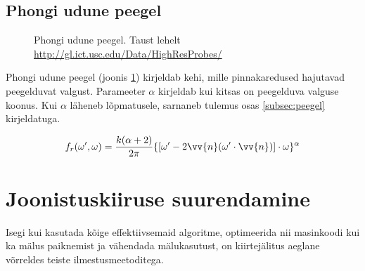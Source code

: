 \documentclass[a4paper,12pt]{report}
\renewcommand{\vec}[1]{\vv{#1}}
\begin{document}
\subsection{Phongi udune peegel}
\begin{figure}[h]
\centering
{}
\caption[Phongi udune peegel]{Phongi udune peegel. Taust lehelt \url{http://gl.ict.usc.edu/Data/HighResProbes/}}
\label{fig:phong}
\vspace{100pt}
\end{figure}
Phongi udune peegel (joonis \ref{fig:phong}) kirjeldab kehi, mille pinnakaredused hajutavad
peegelduvat valgust. Parameeter \(\alpha\) kirjeldab kui kitsas on peegelduva
valguse koonus. Kui \(\alpha\) läheneb lõpmatusele, sarnaneb tulemus
osas \ref{subsec:peegel} kirjeldatuga.

\begin{equation}
f_r(\omega', \omega) = \frac{k(\alpha+2)}{2\pi}\{[\omega'-2\vec n(\omega'\cdot\vec n)]\cdot\omega\}^\alpha
\end{equation}

\section{Joonistuskiiruse suurendamine}
Isegi kui kasutada kõige effektiivsemaid algoritme, optimeerida nii
masinkoodi kui ka mälus paiknemist ja vähendada mälukasutust, on
kiirtejälitus aeglane võrreldes teiste ilmestusmeetoditega.
\end{document}
